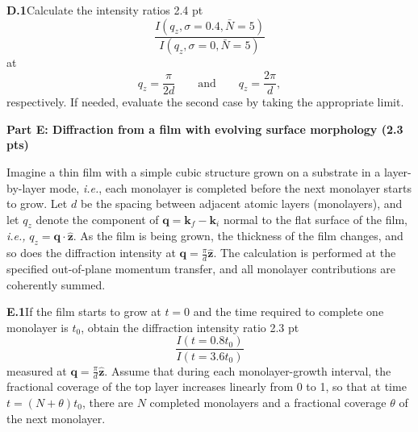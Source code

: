 \textbf{D.1}\quad Calculate the intensity ratios \hfill 2.4 pt
\[
\frac{I(q_z, \sigma = 0.4, \bar{N} = 5)}{I(q_z, \sigma = 0, \bar{N} = 5)}
\]
at
\[
q_z = \frac{\pi}{2d} \qquad \mathrm{and} \qquad q_z = \frac{2\pi}{d},
\]
respectively. If needed, evaluate the second case by taking the appropriate
limit.

\textbf{Part E: Diffraction from a film with evolving surface morphology (2.3 pts)}

Imagine a thin film with a simple cubic structure grown on a substrate in a
layer-by-layer mode, \textit{i.e.}, each monolayer is completed before the next
monolayer starts to grow. Let $d$ be the spacing between adjacent atomic layers
(monolayers), and let $q_z$ denote the component of
$\mathbf{q} = \mathbf{k}_f - \mathbf{k}_i$ normal to the flat surface of the
film, \textit{i.e.,} $q_z = \mathbf{q}\cdot\hat{\mathbf{z}}$. As the film is
being grown, the thickness of the film changes, and so does the diffraction
intensity at $\mathbf{q} = \frac{\pi}{d}\hat{\mathbf{z}}$. The calculation is
performed at the specified out-of-plane momentum transfer, and all monolayer
contributions are coherently summed.

\textbf{E.1}\quad If the film starts to grow at $t = 0$ and the time required to
complete one monolayer is $t_0$, obtain the diffraction intensity ratio
\hfill 2.3 pt
\[
\frac{I(t = 0.8t_0)}{I(t = 3.6t_0)}
\]
measured at $\mathbf{q} = \frac{\pi}{d}\hat{\mathbf{z}}$. Assume that during
each monolayer-growth interval, the fractional coverage of the top layer
increases linearly from 0 to 1, so that at time $t = (N + \theta)t_0$, there are
$N$ completed monolayers and a fractional coverage $\theta$ of the next
monolayer.
